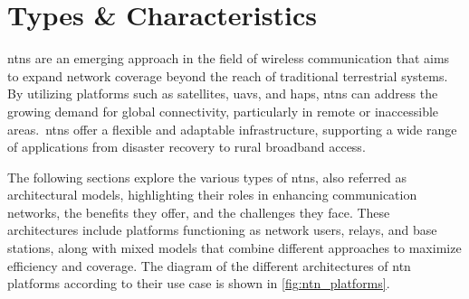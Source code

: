 \chapter{Types \& Characteristics}\label{ch:types_technologies_characteristics}






\glspl{ntn} are an emerging approach in the field of wireless communication that aims to expand network coverage beyond the reach of traditional terrestrial systems. By utilizing platforms such as satellites, \glspl{uav}, and \glspl{hap}, \glspl{ntn} can address the growing demand for global connectivity, particularly in remote or inaccessible areas.\ \glspl{ntn} offer a flexible and adaptable infrastructure, supporting a wide range of applications from disaster recovery to rural broadband access.

The following sections explore the various types of \glspl{ntn}, also referred as architectural models, highlighting their roles in enhancing communication networks, the benefits they offer, and the challenges they face. These architectures include platforms functioning as network users, relays, and base stations, along with mixed models that combine different approaches to maximize efficiency and coverage. The diagram of the different architectures of \gls{ntn} platforms according to their use case is shown in \cref{fig:ntn_platforms}.

